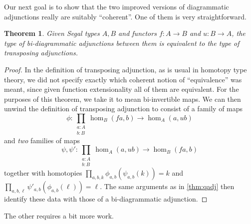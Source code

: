 \documentclass{amsart}
\theoremstyle{plain}
\newtheorem{thm}{Theorem}[section]
\theoremstyle{definition}
\theoremstyle{remark}
\numberwithin{equation}{section}
\begin{document}
Our next goal is to show that the two improved versions of diagrammatic adjunctions really are suitably ``coherent''.
One of them is very straightforward.

\begin{thm}\label{thm:bda}
  Given Segal types $A,B$ and functors $f:A\to B$ and $u:B\to A$, the type of bi-diagrammatic adjunctions between them is equivalent to the type of transposing adjunctions.
\end{thm}
\begin{proof}
  In the definition of transposing adjunction, as is usual in homotopy type theory, we did not specify exactly which coherent notion of ``equivalence'' was meant, since given function extensionality all of them are equivalent.
  For the purposes of this theorem, we take it to mean bi-invertible maps.
  We can then unwind the definition of transposing adjunction to consist of a family of maps
  \[ \phi : \prod_{\substack{a:A\\ b:B}} \hom_B(fa,b) \to \hom_A(a,ub) \]
  and \emph{two} families of maps
  \[ \psi,\psi' : \prod_{\substack{a:A\\ b:B}} \hom_A(a,ub) \to \hom_B(fa,b) \]
  together with homotopies $\prod_{a,b,k} \phi_{a,b}(\psi_{a,b}(k)) = k$ and $\prod_{a,b,\ell} \psi'_{a,b}(\phi_{a,b}(\ell)) = \ell$.
  The same arguments as in \cref{thm:qadj} then identify these data with those of a bi-diagrammatic adjunction.
\end{proof}

The other requires a bit more work.
\end{document}
